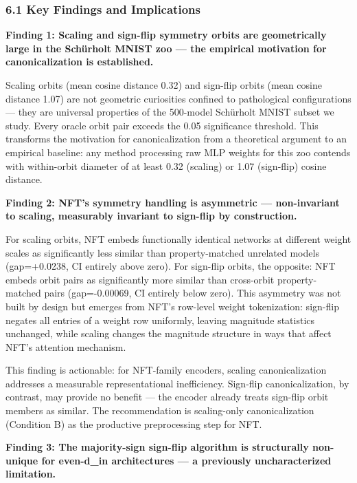 
\subsubsection{6.1 Key Findings and Implications}

\textbf{Finding 1: Scaling and sign-flip symmetry orbits are geometrically large in the Schürholt MNIST zoo --- the empirical motivation for canonicalization is established.}

Scaling orbits (mean cosine distance 0.32) and sign-flip orbits (mean cosine distance 1.07) are not geometric curiosities confined to pathological configurations --- they are universal properties of the 500-model Schürholt MNIST subset we study. Every oracle orbit pair exceeds the 0.05 significance threshold. This transforms the motivation for canonicalization from a theoretical argument to an empirical baseline: any method processing raw MLP weights for this zoo contends with within-orbit diameter of at least 0.32 (scaling) or 1.07 (sign-flip) cosine distance.

\textbf{Finding 2: NFT's symmetry handling is asymmetric --- non-invariant to scaling, measurably invariant to sign-flip by construction.}

For scaling orbits, NFT embeds functionally identical networks at different weight scales as significantly less similar than property-matched unrelated models (gap=+0.0238, CI entirely above zero). For sign-flip orbits, the opposite: NFT embeds orbit pairs as significantly more similar than cross-orbit property-matched pairs (gap=-0.00069, CI entirely below zero). This asymmetry was not built by design but emerges from NFT's row-level weight tokenization: sign-flip negates all entries of a weight row uniformly, leaving magnitude statistics unchanged, while scaling changes the magnitude structure in ways that affect NFT's attention mechanism.

This finding is actionable: for NFT-family encoders, scaling canonicalization addresses a measurable representational inefficiency. Sign-flip canonicalization, by contrast, may provide no benefit --- the encoder already treats sign-flip orbit members as similar. The recommendation is scaling-only canonicalization (Condition B) as the productive preprocessing step for NFT.

\textbf{Finding 3: The majority-sign sign-flip algorithm is structurally non-unique for even-d\_in architectures --- a previously uncharacterized limitation.}

